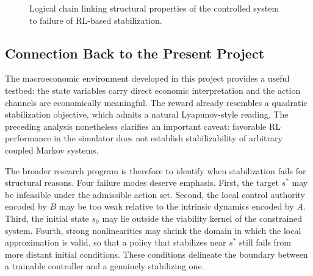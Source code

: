 \documentclass[11pt]{article}
\begin{document}
\begin{figure}[ht]
\centering
{}
\caption{Logical chain linking structural properties of the controlled system to failure of RL-based stabilization.}
\end{figure}

\subsection{Connection Back to the Present Project}
The macroeconomic environment developed in this project provides a useful testbed: the state variables carry direct economic interpretation and the action channels are economically meaningful. The reward already resembles a quadratic stabilization objective, which admits a natural Lyapunov-style reading. The preceding analysis nonetheless clarifies an important caveat: favorable RL performance in the simulator does not establish stabilizability of arbitrary coupled Markov systems.

The broader research program is therefore to identify when stabilization fails for structural reasons. Four failure modes deserve emphasis. First, the target $s^*$ may be infeasible under the admissible action set. Second, the local control authority encoded by $B$ may be too weak relative to the intrinsic dynamics encoded by $A$. Third, the initial state $s_0$ may lie outside the viability kernel of the constrained system. Fourth, strong nonlinearities may shrink the domain in which the local approximation is valid, so that a policy that stabilizes near $s^*$ still fails from more distant initial conditions. These conditions delineate the boundary between a trainable controller and a genuinely stabilizing one.
\end{document}
